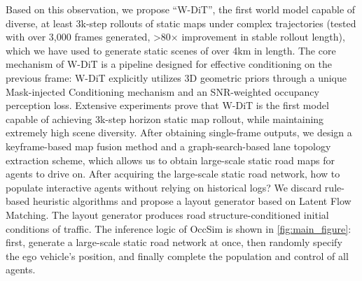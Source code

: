 Based on this observation, we propose ``W-DiT'', the first world model capable of diverse, at least 3k-step rollouts of static maps under complex trajectories (tested with over 3,000 frames generated, >80$\times$ improvement in stable rollout length), which we have used to generate static scenes of over 4km in length. The core mechanism of W-DiT is a pipeline designed for effective conditioning on the previous frame: W-DiT explicitly utilizes 3D geometric priors through a unique Mask-injected Conditioning mechanism and an SNR-weighted occupancy perception loss. Extensive experiments prove that W-DiT is the first model capable of achieving 3k-step horizon static map rollout, while maintaining extremely high scene diversity. After obtaining single-frame outputs, we design a keyframe-based map fusion method and a graph-search-based lane topology extraction scheme, which allows us to obtain large-scale static road maps for agents to drive on. After acquiring the large-scale static road network, how to populate interactive agents without relying on historical logs? We discard rule-based heuristic algorithms and propose a layout generator based on Latent Flow Matching. The layout generator produces road structure-conditioned initial conditions of traffic. The inference logic of OccSim is shown in \cref{fig:main_figure}: first, generate a large-scale static road network at once, then randomly specify the ego vehicle's position, and finally complete the population and control of all agents.

